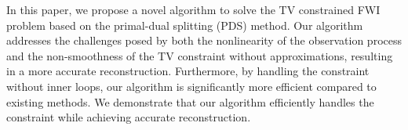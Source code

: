 In this paper, we propose a novel algorithm to solve the TV constrained FWI problem based on the primal-dual splitting (PDS) method.
Our algorithm addresses the challenges posed by both the nonlinearity of the observation process and the non-smoothness of the TV constraint without approximations, resulting in a more accurate reconstruction.
Furthermore, by handling the constraint without inner loops, our algorithm is significantly more efficient compared to existing methods.
We demonstrate that our algorithm efficiently handles the constraint while achieving accurate reconstruction.
